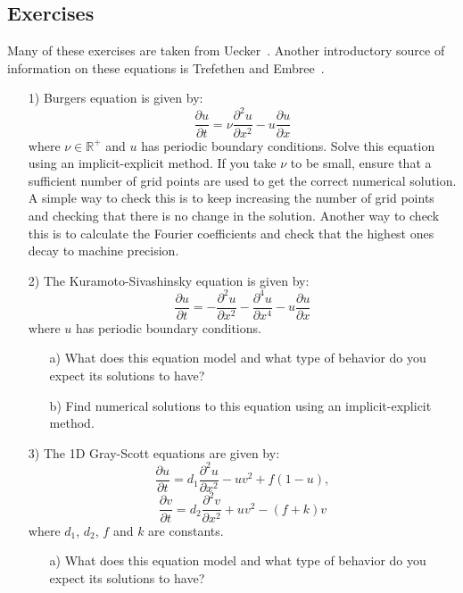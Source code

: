 

\subsection{Exercises}

Many of these exercises are taken from Uecker~\cite{Uec09}. Another introductory source of information on these equations is Trefethen and Embree~\cite{TreEmb01}.

\begin{enumerate}
\item[1)] Burgers equation is given by:
$$\frac{\partial u}{\partial t}=\nu \frac{\partial^2 u}{\partial x^2} - u\frac{\partial u}{\partial x}$$
where $\nu\in\mathbb{R}^+$ and $u$ has periodic boundary conditions. Solve this equation using an implicit-explicit method. If you take $\nu$ to be small, ensure that a sufficient number of grid points are used to get the correct numerical solution. A simple way to check this is to keep increasing the number of grid points and checking that there is no change in the solution. Another way to check this is to calculate the Fourier coefficients and check that the highest ones decay to machine precision. 
\item[2)] The Kuramoto-Sivashinsky equation is given by:
$$\frac{\partial u}{\partial t}=-\frac{\partial^2 u}{\partial x^2}-\frac{\partial^4 u}{\partial x^4}-u\frac{\partial u}{\partial x}$$
where $u$ has periodic boundary conditions.
\begin{itemize}
\item[a)] What does this equation model and what type of behavior do you expect its solutions to have?
\item[b)] Find numerical solutions to this equation using an implicit-explicit method.
\end{itemize}
\item[3)] The 1D Gray-Scott equations are given by:
$$\frac{\partial u}{\partial t}=d_1\frac{\partial^2 u}{\partial x^2}-uv^2+f(1-u),$$
$$\frac{\partial v}{\partial t}=d_2\frac{\partial^2 v}{\partial x^2} + uv^2 - (f+k)v$$
where $d_1$, $d_2$, $f$ and $k$ are constants. 
\begin{itemize}
\item[a)] What does this equation model and what type of behavior do you expect its solutions to have?

\end{itemize}
\end{enumerate}
